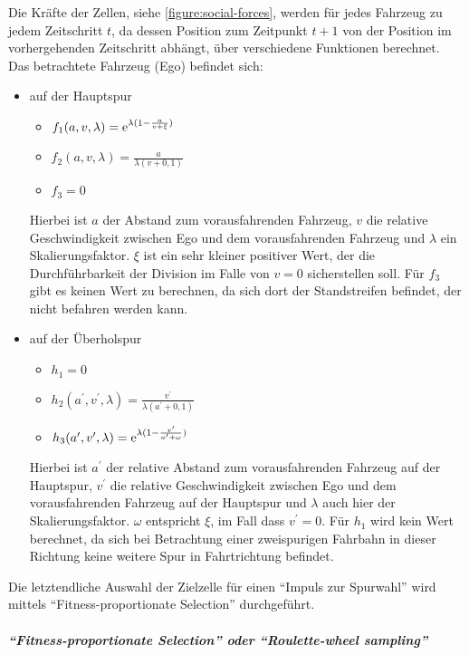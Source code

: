 Die Kräfte der Zellen, siehe \cref{figure:social-forces}, werden für jedes Fahrzeug zu jedem Zeitschritt $t$, da dessen Position zum Zeitpunkt $t + 1$ von der Position im vorhergehenden Zeitschritt abhängt, über verschiedene Funktionen berechnet. Das betrachtete Fahrzeug (Ego) befindet sich:
\begin{itemize}
	\item auf der Hauptspur 
	\begin{itemize}
		\item $f_{1}(a,v,\lambda) = \operatorname{e}^{\lambda(1-\frac{a}{v+\xi})}$ 
		\item $f_{2}(a,v,\lambda) = \frac{a}{\lambda(v+0,1)}$ 
		\item $f_{3} = 0$ 
	\end{itemize}
Hierbei ist $a$ der Abstand zum vorausfahrenden Fahrzeug, $v$ die relative Geschwindigkeit zwischen Ego und dem vorausfahrenden Fahrzeug und $\lambda$ ein Skalierungsfaktor. $\xi$ ist ein sehr kleiner positiver Wert, der die Durchführbarkeit der Division im Falle von $v=0$ sicherstellen soll. Für $f_{3}$ gibt es keinen Wert zu berechnen, da sich dort der Standstreifen befindet, der nicht befahren werden kann.
	\item auf der Überholspur 
	\begin{itemize}
		\item $h_{1} = 0$ 
		\item $h_{2}(a^{\prime},v^{\prime},\lambda) = \frac{v^{\prime}}{\lambda(a^{\prime}+0,1)}$ 
		\item $h_{3}(a^{\prime},v^{\prime},\lambda) = \operatorname{e}^{\lambda(1-\frac{v^{\prime}}{a^{\prime}+\omega})}$ 
	\end{itemize}
Hierbei ist $a^{\prime}$ der relative Abstand zum vorausfahrenden Fahrzeug auf der Hauptspur, $v^{\prime}$ die relative Geschwindigkeit zwischen Ego und dem vorausfahrenden Fahrzeug auf der Hauptspur und $\lambda$ auch hier der Skalierungsfaktor. $\omega$ entspricht $\xi$, im Fall dass $v^{\prime}=0$. Für $h_{1}$ wird kein Wert berechnet, da sich bei Betrachtung einer zweispurigen Fahrbahn in dieser Richtung keine weitere Spur in Fahrtrichtung befindet.
\end{itemize}

Die letztendliche Auswahl der Zielzelle für einen \enquote{Impuls zur Spurwahl} wird mittels \enquote{Fit\-ness-proportionate Selection} durchgeführt.


\subparagraph{\enquote{Fitness-proportionate Selection} oder \enquote{Roulette-wheel sampling}}

